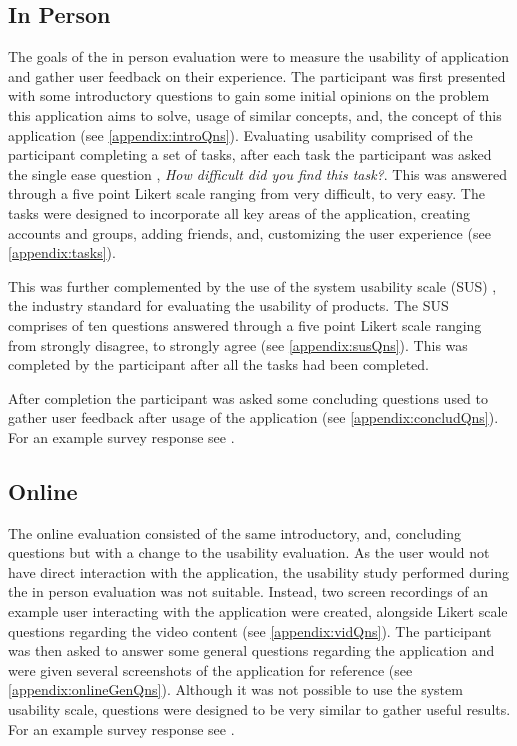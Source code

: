 \subsection{In Person}
The goals of the in person evaluation were to measure the usability of application and gather user feedback on their experience. The participant was first presented with some introductory questions to gain some initial opinions on the problem this application aims to solve, usage of similar concepts, and, the concept of this application (see \ref{appendix:introQns}).
Evaluating usability comprised of the participant completing a set of tasks, after each task the participant was asked the single ease question \cite{seq}, \textit{How difficult did you find this task?}. This was answered through a five point Likert scale ranging from very difficult, to very easy. 
The tasks were designed to incorporate all key areas of the application, creating accounts and groups, adding friends, and, customizing the user experience (see \ref{appendix:tasks}).

This was further complemented by the use of the system usability scale (SUS) \cite{sus}, the industry standard for evaluating the usability of products. The SUS comprises of ten questions answered through a five point Likert scale ranging from strongly disagree, to strongly agree (see \ref{appendix:susQns}). This was completed by the participant after all the tasks had been completed.

After completion the participant was asked some concluding questions used to gather user feedback after usage of the application (see \ref{appendix:concludQns}). 
For an example survey response see \cite{evalRespWApp}.

\subsection{Online}
The online evaluation consisted of the same introductory, and, concluding questions but with a change to the usability evaluation. As the user would not have direct interaction with the application, the usability study performed during the in person evaluation was not suitable. Instead, two screen recordings of an example user interacting with the application were created, alongside Likert scale questions regarding the video content (see \ref{appendix:vidQns}). The participant was then asked to answer some general questions regarding the application and were given several screenshots of the application for reference (see \ref{appendix:onlineGenQns}). Although it was not possible to use the system usability scale, questions were designed to be very similar to gather useful results. For an example survey response see \cite{evalRespNoApp}. 

